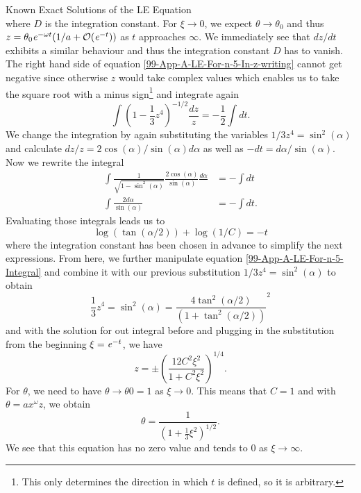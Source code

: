 \begin{appendix}
\begin{section}
\begin{subsection}{Known Exact Solutions of the LE Equation}
\begin{equation}
	\label{99-App-A-LE-For-n-5-In-z-writing}
\end{equation}
where $D$ is the integration constant. For $\xi\rightarrow0$, we expect $\theta\rightarrow\theta_0$ and thus $z=\theta_0\mathit{e}^{-\omega t}(1/a+\mathcal{O}(\mathit{e}^{-t}))$ as $t$ approaches $\infty$. We immediately see that $dz/dt$ exhibits a similar behaviour and thus the integration constant $D$ has to vanish.\\
The right hand side of equation \ref{99-App-A-LE-For-n-5-In-z-writing} cannot get negative since otherwise $z$ would take complex values which enables us to take the square root with a minus sign\footnote{This only determines the direction in which $t$ is defined, so it is arbitrary.} and integrate again
\begin{equation}
	\int\left(1-\frac{1}{3}z^4\right)^{-1/2}\frac{dz}{z}=-\frac{1}{2}\int dt.
\end{equation}
We change the integration by again substituting the variables $1/3z^4=\sin^2(\alpha)$ and calculate $dz/z=2\cos(\alpha)/\sin(\alpha)d\alpha$ as well as $-dt=d\alpha/\sin(\alpha)$. Now we rewrite the integral
\begin{align}
	\int\frac{1}{\sqrt{1-\sin^2(\alpha)}}\frac{2\cos(\alpha)}{\sin(\alpha)}\frac{d\alpha}{} &= -\int dt\\
	\int\frac{2d\alpha}{\sin(\alpha)} &= -\int dt.
\end{align}
Evaluating those integrals leads us to
\begin{equation}
	\log(\tan(\alpha/2))+\log(1/C) = -t
	\label{99-App-A-LE-For-n-5-Integral}
\end{equation}
where the integration constant has been chosen in advance to simplify the next expressions. From here, we further manipulate equation \ref{99-App-A-LE-For-n-5-Integral} and combine it with our previous substitution $1/3z^4=\sin^2(\alpha)$ to obtain
\begin{equation}
	\frac{1}{3}z^4=\sin^2(\alpha)=\frac{4\tan^2(\alpha/2)}{\left(1+\tan^2(\alpha/2)\right)}^2
\end{equation}
and with the solution for out integral before and plugging in the substitution from the beginning $\xi=\mathit{e}^{-t}$, we have
\begin{equation}
	z=\pm\left(\frac{12C^2\xi^2}{1+C^2\xi^2}\right)^{1/4}.
\end{equation}
For $\theta$, we need to have $\theta\rightarrow\theta0=1$ as $\xi\rightarrow0$. This means that $C=1$ and with $\theta=ax^\omega z$, we obtain
\begin{equation}
	\theta = \frac{1}{\left(1+\frac{1}{3}\xi^2\right)^{1/2}}.
\end{equation}
We see that this equation has no zero value and tends to $0$ as $\xi\rightarrow\infty$.
\end{subsection}
%
%
%

\end{section}
\end{appendix}
